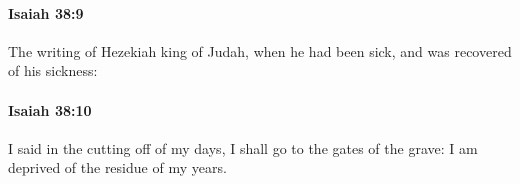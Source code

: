 		\paragraph{Isaiah 38:9} %
			\label{ISAIAH-38-9}

			The writing of Hezekiah king of Judah, when he had been sick, and was recovered of his sickness:


		\paragraph{Isaiah 38:10} %
			\label{ISAIAH-38-10}

			I said in the cutting off of my days, I shall go to the gates of the grave: I am deprived of the residue of my years.


